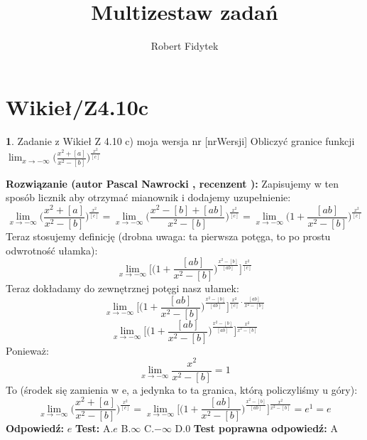 \documentclass[12pt, a4paper]{article}
\title{Multizestaw zadań}
\author{Robert Fidytek}
\date{}
\theoremstyle{definition} %
\newtheorem{zad}{}
\newcommand{\kategoria}[1]{\section{#1}} %
\newcommand{\zadStart}[1]{\begin{zad}#1\newline} %
\newcommand{\zadStop}{\end{zad}}   %
\newcommand{\rozwStart}[2]{\noindent \textbf{Rozwiązanie (autor #1 , recenzent #2): }\newline} %
\newcommand{\odpStart}{\noindent \textbf{Odpowiedź:}\newline}    %
\newcommand{\odpStop}{\newline}                                             %
\newcommand{\testStart}{\noindent \textbf{Test:}\newline} %
\newcommand{\testStop}{\newline} %
\newcommand{\kluczStart}{\noindent \textbf{Test poprawna odpowiedź:}\newline} %
\newcommand{\kluczStop}{\newline} %
\begin{document}
\maketitle


\kategoria{Wikieł/Z4.10c}
\zadStart{Zadanie z Wikieł Z 4.10 c) moja wersja nr [nrWersji]}
Obliczyć granice funkcji $\displaystyle{\lim_{x \to -\infty}}\bigg(\frac{x^2+[a]}{x^2-[b]}\bigg)^{\frac{x^2}{[c]}}$
\zadStop
\rozwStart{Pascal Nawrocki}{}
Zapisujemy w ten sposób licznik aby otrzymać mianownik i dodajemy uzupełnienie:
$$\displaystyle{\lim_{x \to -\infty}}\bigg(\frac{x^2+[a]}{x^2-[b]}\bigg)^{\frac{x^2}{[c]}}=\displaystyle{\lim_{x \to -\infty}}\bigg(\frac{x^2-[b]+[ab]}{x^2-[b]}\bigg)^{\frac{x^2}{[c]}}=\displaystyle{\lim_{x \to -\infty}}\bigg(1+\frac{[ab]}{x^2-[b]}\bigg)^{\frac{x^2}{[c]}}$$
Teraz stosujemy definicję (drobna uwaga: ta pierwsza potęga, to po prostu odwrotność ułamka):
$$\displaystyle{\lim_{x \to -\infty}}\bigg[\bigg(1+\frac{[ab]}{x^2-[b]}\bigg)^{\frac{x^2-[b]}{[ab]}}\bigg]^{\frac{x^2}{[c]}}$$
Teraz dokładamy do zewnętrznej potęgi nasz ułamek:
$$\displaystyle{\lim_{x \to -\infty}}\bigg[\bigg(1+\frac{[ab]}{x^2-[b]}\bigg)^{\frac{x^2-[b]}{[ab]}}\bigg]^{\frac{x^2}{[c]}\cdot\frac{[ab]}{x^2-[b]}}$$
$$\displaystyle{\lim_{x \to -\infty}}\bigg[\bigg(1+\frac{[ab]}{x^2-[b]}\bigg)^{\frac{x^2-[b]}{[ab]}}\bigg]^{\frac{x^2}{x^2-[b]}}$$
Ponieważ:
$$\displaystyle{\lim_{x \to -\infty}}\frac{x^2}{x^2-[b]}=1$$
To (środek się zamienia w e, a jedynka to ta granica, którą policzyliśmy u góry):
$$\displaystyle{\lim_{x \to -\infty}}\bigg(\frac{x^2+[a]}{x^2-[b]}\bigg)^{\frac{x^2}{[c]}}=\displaystyle{\lim_{x \to -\infty}}\bigg[\bigg(1+\frac{[ab]}{x^2-[b]}\bigg)^{\frac{x^2-[b]}{[ab]}}\bigg]^{\frac{x^2}{x^2-[b]}}=e^1=e$$
\odpStart
$e$
\odpStop
\testStart
A.$e$
B.$\infty$
C.$-\infty$
D.$0$
\testStop
\kluczStart
A
\kluczStop
\end{document}
